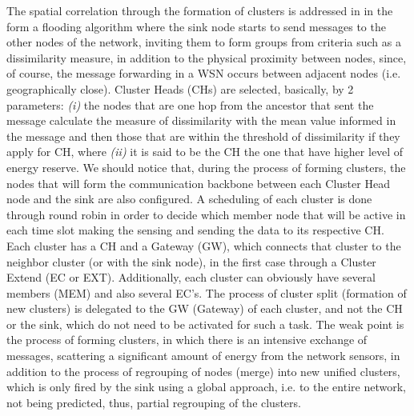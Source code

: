 \documentclass[conference]{IEEEtran}
\begin{document}
The spatial correlation through the formation of clusters is addressed in
\cite{Pham2010} in the form a flooding algorithm where the sink node starts to
send messages to the other nodes of the network, inviting them to form groups
from criteria such as a dissimilarity measure, in addition to the physical
proximity between nodes, since, of course, the message forwarding in a WSN
occurs between adjacent nodes (i.e. geographically close). Cluster Heads (CHs)
are selected, basically, by 2 parameters: {\it (i)} the nodes that are one hop
from the ancestor that sent the message calculate the measure of dissimilarity
with the mean value informed in the message and then those that are within the
threshold of dissimilarity if they apply for CH, where {\it (ii)} it is said to
be the CH the one that have higher level of energy reserve.
We should notice that, during the process of forming clusters, the nodes that
will form the communication backbone between each Cluster Head node and the sink
are also configured. A scheduling of each cluster is done through round robin in
order to decide which member node that will be active in each time slot making
the sensing and sending the data to its respective CH.
Each cluster has a CH and a Gateway (GW), which connects that cluster to the
neighbor cluster (or with the sink node), in the first case through a Cluster
Extend (EC or EXT).
Additionally, each cluster can obviously have several members (MEM) and also
several EC's.
The process of cluster split (formation of new clusters) is delegated to the GW
(Gateway) of each cluster, and not the CH or the sink, which do not need to be
activated for such a task. The weak point is the process of forming clusters, in
which there is an intensive exchange of messages, scattering a significant
amount of energy from the network sensors, in addition to the process of
regrouping of nodes (merge) into new unified clusters, which is only fired by
the sink using a global approach, i.e. to the entire network, not being
predicted, thus, partial regrouping of the clusters.
\end{document}
